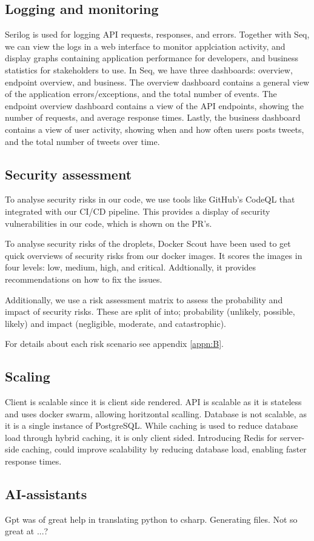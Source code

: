 \subsection{Logging and monitoring}
Serilog is used for logging API requests, responses, and errors.
Together with Seq, we can view the logs in a web interface to monitor 
applciation activity, and display graphs containing application performance 
for developers, and business statistics for stakeholders to use.
In Seq, we have three dashboards: overview, endpoint overview, and business.
The overview dashboard contains a general view of the application 
errors/exceptions, and the total number of events.
The endpoint overview dashboard contains a view of the API endpoints,
showing the number of requests, and average response times.
Lastly, the business dashboard contains a view of user activity,
showing when and how often users posts tweets, and the total number of tweets over time.


\subsection{Security assessment}
To analyse security risks in our code, we use tools like GitHub's CodeQL\cite{codeql} that 
integrated with our CI/CD pipeline.
This provides a display of security vulnerabilities in our code,
which is shown on the PR's.

To analyse security risks of the droplets, Docker Scout have been used to get
quick overviews of security risks from our docker images.
It scores the images in four levels: low, medium, high, and critical.
Addtionally, it provides recommendations on how to fix the issues.


Additionally, we use a risk assessment matrix to assess the probability and impact of security risks. 
These are split of into; probability (unlikely, possible, likely) and impact (negligible, moderate, and catastrophic).


For details about each risk scenario see appendix \ref{appn:B}.

\subsection{Scaling}
Client is scalable since it is client side rendered.
API is scalable as it is stateless and uses docker swarm, allowing horitzontal scalling.
Database is not scalable, as it is a single instance of PostgreSQL.
While caching is used to reduce database load through hybrid caching, it is only client sided. Introducing Redis for server-side caching, could improve scalability by reducing database load, enabling faster response times. 


\subsection{AI-assistants}

Gpt was of great help in translating python to csharp.
Generating files.
Not so great at ...?